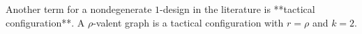 Another term for a nondegenerate $1$-design in the literature is **tactical configuration**. A $\rho$-valent graph is a tactical configuration with $r = \rho$ and $k = 2$.

